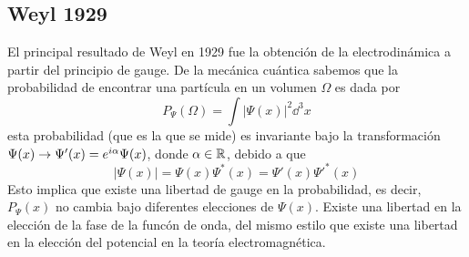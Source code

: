 \subsection{Weyl 1929}
El principal resultado de Weyl en 1929 fue la obtención de la electrodinámica a partir del principio de gauge. De la mecánica cuántica sabemos que la probabilidad de encontrar una partícula en un volumen $\Omega$ es dada por
\begin{equation}
  P_\Psi(\Omega)=\int |\Psi(x) |^2\dd^3x
\end{equation}
esta probabilidad (que es la que se mide) es invariante bajo la transformación $\Psi(x)\to \Psi'(x)=e^{i\alpha }\Psi(x)$, donde $\alpha \in\mathbb{R}$, debido a que
\begin{equation}
  |\Psi(x)|=\Psi(x)\Psi^*(x)=\Psi'(x)\Psi'^*(x)
\end{equation}
Esto implica que existe una libertad de gauge en la probabilidad, es decir, $P_\Psi(x)$ no cambia bajo diferentes elecciones de $\Psi(x)$. Existe una libertad en la elección de la fase de la funcón de onda, del mismo estilo que existe una libertad en la elección del potencial en la teoría electromagnética.





































































































